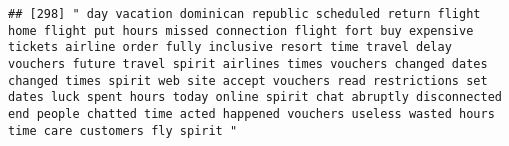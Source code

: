 \documentclass[
]{article}
\begin{document}
\begin{verbatim}
## [298] " day vacation dominican republic scheduled return flight home flight put hours missed connection flight fort buy expensive tickets airline order fully inclusive resort time travel delay vouchers future travel spirit airlines times vouchers changed dates changed times spirit web site accept vouchers read restrictions set dates luck spent hours today online spirit chat abruptly disconnected end people chatted time acted happened vouchers useless wasted hours time care customers fly spirit "                                                                                                                                                                                                                                                                                                                                                                                                                                                                                                                                                                                                                                                                                                                                                                                                                                                                                                                                                                                                                                                                                                                                                                                                                                                                                  

\end{verbatim}
\end{document}
